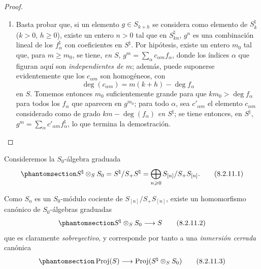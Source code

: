 \documentclass[oneside,10pt]{amsart}
\makeatletter
\renewcommand{\geq}{\geqslant}
\newcommand{\ega@arrow}[2]{\mathchoice{#1}{#2}{#2}{#2}}
\renewcommand{\to}{\ega@arrow{\longrightarrow}{\rightarrow}}
\let\EGAOriginalLabel\label
\renewcommand{\label}[1]{\phantomsection\EGAOriginalLabel{#1}}
\makeatother
\begin{document}
\begin{proof}
\begin{enumerate}
    la igualdad $S_n^\natural=S_1^{\natural n}$ implica, pues, que $S_n=S_1^n$.
  \item[\rm{(iv)}] Basta probar que, si un elemento $g\in S_{k+h}$ se considera como elemento de $S_k^\natural$ ($k>0$, $h\geq0$), existe un entero $n>0$ tal que en $S_{kn}^\natural$, $g^n$ es una combinación lineal de los $f_\alpha^\natural$ con coeficientes en $S^\natural$.
    Por hipótesis, existe un entero $m_0$ tal que, para $m\geq m_0$, se tiene, \emph{en $S$}, $g^m=\sum_\alpha c_{\alpha m}f_\alpha$, donde los índices $\alpha$ que figuran aquí son \emph{independientes de $m$};
    además, puede suponerse evidentemente que los $c_{\alpha m}$ son homogéneos, con
    \[
  \deg(c_{\alpha m})=m(k+h)-\deg f_\alpha
\]
    en $S$.
    Tomemos entonces $m_0$ suficientemente grande para que $km_0>\deg f_\alpha$ para todos los $f_\alpha$ que aparecen en $g^{m_0}$;
    para todo $\alpha$, sea $c'_{\alpha m}$ el elemento $c_{\alpha m}$ considerado como de grado $km-\deg(f_\alpha)$ \emph{en $S^\natural$};
    se tiene entonces, en $S^\natural$, $g^m=\sum_\alpha c'_{\alpha m}f_\alpha^\natural$, lo que termina la demostración.
\end{enumerate}
\end{proof}

\begin{env}[8.2.11]
\label{II.8.2.11-fr}
Consideremos la $S_0$-álgebra graduada
\begin{equation}
\label{II.8.2.11.1-fr}
  S^\natural\otimes_S S_0=S^\natural/S_+S^\natural
  =\bigoplus_{n\geq0}S_{[n]}/S_+S_{[n]}.
\tag{8.2.11.1}
\end{equation}

Como $S_n$ es un $S_0$-módulo cociente de $S_{[n]}/S_+S_{[n]}$, existe un homomorfismo canónico de $S_0$-álgebras graduadas
\begin{equation}
\label{II.8.2.11.2-fr}
  S^\natural\otimes_S S_0\to S
\tag{8.2.11.2}
\end{equation}
que es claramente \emph{sobreyectivo}, y corresponde por tanto  a una \emph{inmersión cerrada} canónica
\begin{equation}
\label{II.8.2.11.3-fr}
  \operatorname{Proj}(S)\to
  \operatorname{Proj}(S^\natural\otimes_S S_0)
\tag{8.2.11.3}
\end{equation}
\end{env}
\end{document}
